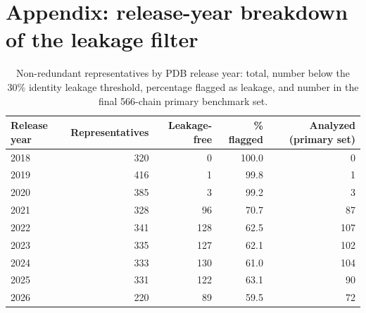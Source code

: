 \documentclass[10pt]{article}
\begin{document}
\appendix
\section*{Appendix: release-year breakdown of the leakage filter}

\renewcommand{\thetable}{S2}
\begin{table}[h]
\centering
\small
\begin{tabular}{lrrrr}
\toprule
Release year & Representatives & Leakage-free & \% flagged & Analyzed (primary set) \\
\midrule
2018 & 320 & 0 & 100.0 & 0 \\
2019 & 416 & 1 & 99.8 & 1 \\
2020 & 385 & 3 & 99.2 & 3 \\
2021 & 328 & 96 & 70.7 & 87 \\
2022 & 341 & 128 & 62.5 & 107 \\
2023 & 335 & 127 & 62.1 & 102 \\
2024 & 333 & 130 & 61.0 & 104 \\
2025 & 331 & 122 & 63.1 & 90 \\
2026 & 220 & 89 & 59.5 & 72 \\
\bottomrule
\end{tabular}
\caption{Non-redundant representatives by PDB release
year: total, number below the 30\% identity leakage
threshold, percentage flagged as leakage, and number in the final
566-chain primary benchmark set.}
\label{tab:releaseyear}
\end{table}
\end{document}
